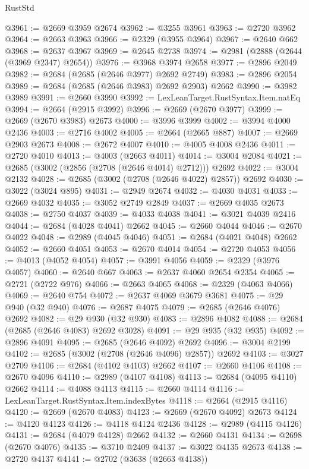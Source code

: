 \begin{lexlean}{RustStd}
\begin{coremodule}
@3961 := @2669 @3959 @2674
@3962 := @3255 @3961
@3963 := @2720 @3962
@3964 := @2663 @3963
@3966 := @2329 (@3955 @3964)
@3967 := @2640 @662
@3968 := @2637 @3967
@3969 := @2645 @2738
@3974 := @2981 (@2888 (@2644 (@3969 @2347) @2654))
@3976 := @3968 @3974 @2658
@3977 := @2896 @2049
@3982 := @2684 (@2685 (@2646 @3977) @2692 @2749)
@3983 := @2896 @2054
@3989 := @2684 (@2685 (@2646 @3983) @2692 @2903) @2662
@3990 := @3982 @3989
@3991 := @2660 @3990
@3992 := LexLeanTarget.RustSyntax.Item.natEq
@3994 := @2664 (@2915 @3992)
@3996 := @2669 (@2670 @3977)
@3999 := @2669 (@2670 @3983) @2673
@4000 := @3996 @3999
@4002 := @3994 @4000 @2436
@4003 := @2716 @4002
@4005 := @2664 (@2665 @887)
@4007 := @2669 @2903 @2673
@4008 := @2672 @4007
@4010 := @4005 @4008 @2436
@4011 := @2720 @4010
@4013 := @4003 (@2663 @4011)
@4014 := @3004 @2084
@4021 := @2685 (@3002 (@2856 (@2708 (@2646 @4014) @2712))) @2692
@4022 := @3004 @2132
@4028 := @2685 (@3002 (@2708 (@2646 @4022) @2857)) @2692
@4030 := @3022 (@3024 @895)
@4031 := @2949 @2674
@4032 := @4030 @4031
@4033 := @2669 @4032
@4035 := @3052 @2749 @2849
@4037 := @2669 @4035 @2673
@4038 := @2750 @4037
@4039 := @4033 @4038
@4041 := @3021 @4039 @2416
@4044 := @2684 (@4028 @4041) @2662
@4045 := @2660 @4044
@4046 := @2670 @4022
@4048 := @2989 (@4045 @4046)
@4051 := @2684 (@4021 @4048) @2662
@4052 := @2660 @4051
@4053 := @2670 @4014
@4054 := @2720 @4053
@4056 := @4013 (@4052 @4054)
@4057 := @3991 @4056
@4059 := @2329 (@3976 @4057)
@4060 := @2640 @667
@4063 := @2637 @4060 @2654 @2354
@4065 := @2721 (@2722 @976)
@4066 := @2663 @4065
@4068 := @2329 (@4063 @4066)
@4069 := @2640 @754
@4072 := @2637 @4069 @3679 @3681
@4075 := @29 @940 (@32 @940)
@4076 := @2687 @4075
@4079 := @2685 (@2646 @4076) @2692
@4082 := @29 @930 (@32 @930)
@4083 := @2896 @4082
@4088 := @2684 (@2685 (@2646 @4083) @2692 @3028)
@4091 := @29 @935 (@32 @935)
@4092 := @2896 @4091
@4095 := @2685 (@2646 @4092) @2692
@4096 := @3004 @2199
@4102 := @2685 (@3002 (@2708 (@2646 @4096) @2857)) @2692
@4103 := @3027 @2709
@4106 := @2684 (@4102 @4103) @2662
@4107 := @2660 @4106
@4108 := @2670 @4096
@4110 := @2989 (@4107 @4108)
@4113 := @2684 (@4095 @4110) @2662
@4114 := @4088 @4113
@4115 := @2660 @4114
@4116 := LexLeanTarget.RustSyntax.Item.indexBytes
@4118 := @2664 (@2915 @4116)
@4120 := @2669 (@2670 @4083)
@4123 := @2669 (@2670 @4092) @2673
@4124 := @4120 @4123
@4126 := @4118 @4124 @2436
@4128 := @2989 (@4115 @4126)
@4131 := @2684 (@4079 @4128) @2662
@4132 := @2660 @4131
@4134 := @2698 (@2670 @4076)
@4135 := @3710 @2409
@4137 := @3022 @4135 @2673
@4138 := @2720 @4137
@4141 := @2702 (@3638 (@2663 @4138))

\end{coremodule}
\end{lexlean}
